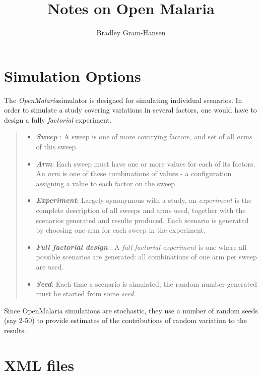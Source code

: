 \documentclass[]{scrartcl}
\title{Notes on Open Malaria}
\author{Bradley Gram-Hansen}
\newcommand{\om}{\textit{OpenMalaria}}
\begin{document}
\maketitle

\begin{abstract}

\end{abstract}

% 


\section{Simulation Options}

The \om simulator is designed for simulating individual scenarios. 
In order to simulate a study covering variations in several factors, one 
would have to  design a fully \textit{factorial} experiment.

\begin{quote}
	\begin{itemize}
		\item \textbf{\textit{Sweep}} : A sweep is one of more covarying factors, and set of all \textit{arms} of this sweep.
		\item \textbf{\textit{Arm}}: Each sweep must have one or more values for each of its factors. An \textit{arm} 
		is one of these combinations of values - a configuration assigning a value to each factor on the sweep. 
		\item \textbf{\textit{Experiment}}: Largely synonymous with a study, an \textit{experiment} is the complete
		description of all sweeps and arms used, together with the scenarios generated and results produced. Each scenario is generated by choosing
		one arm for each sweep in the experiment. 
		\item \textbf{\textit{Full factorial design}} : A \textit{full factorial experiment} is one where all possible scenarios are generated: all
		combinations of one arm per sweep are used.
		\item \textbf{\textit{Seed}}: Each time a scenario is simulated, the random number generated must be started from some \textit{seed}.
	\end{itemize}
\end{quote}


Since OpenMalaria simulations are stochastic, they use a number of random seeds (say 2-50) 
to provide estimates of the contributions of random variation to the results.

\section{XML files}
\end{document}
